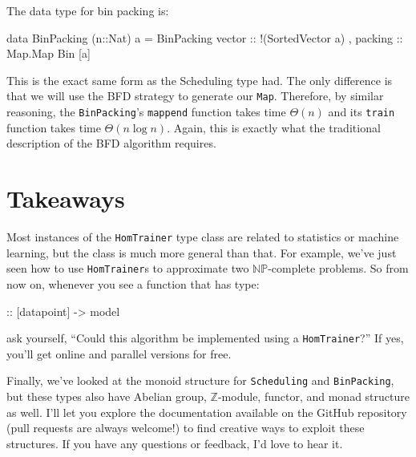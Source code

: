 \documentclass[tikz]{tmr}
\newcommand\h{\lstinline}
\newcommand{\np}{{\ensuremath{\mathbb{NP}}}}
\newcommand\+{\mdoubleplus}
\begin{document}
\begin{figure}[H]
\begin{tikzpicture}
\end{tikzpicture}
\vspace{0.05in}
\end{figure}

The data type for bin packing is:
\begin{spec}
data BinPacking (n::Nat) a = BinPacking
    { vector  :: !(SortedVector a)
    , packing :: Map.Map Bin [a]
    }
\end{spec}
This is the exact same form as the Scheduling type had.
The only difference is that we will use the BFD strategy to generate our \h{Map}.
Therefore, by similar reasoning, the \h{BinPacking}'s \h{mappend} function takes time $\Theta(n)$ and its \h{train} function takes time $\Theta(n\log n)$.
Again, this is exactly what the traditional description of the BFD algorithm requires.

\section{Takeaways}

Most instances of the \h{HomTrainer} type class are related to statistics or machine learning, but the class is much more general than that.
For example, we've just seen how to use \h{HomTrainer}s to approximate two \np-complete problems.
So from now on, whenever you see a function that has type:
\begin{spec}
 :: [datapoint] -> model
\end{spec}
ask yourself, ``Could this algorithm be implemented using a \h{HomTrainer}?''
If yes, you'll get online and parallel versions for free.

Finally, we've looked at the monoid structure for \h{Scheduling} and \h{BinPacking}, but these types also have Abelian group, $\mathbb{Z}$-module, functor, and monad structure as well.
I'll let you explore the documentation available on the GitHub repository \cite{hlearn} 
(pull requests are always welcome!)
to find creative ways to exploit these structures.
If you have any questions or feedback, I'd love to hear it.

% 

\end{document}
